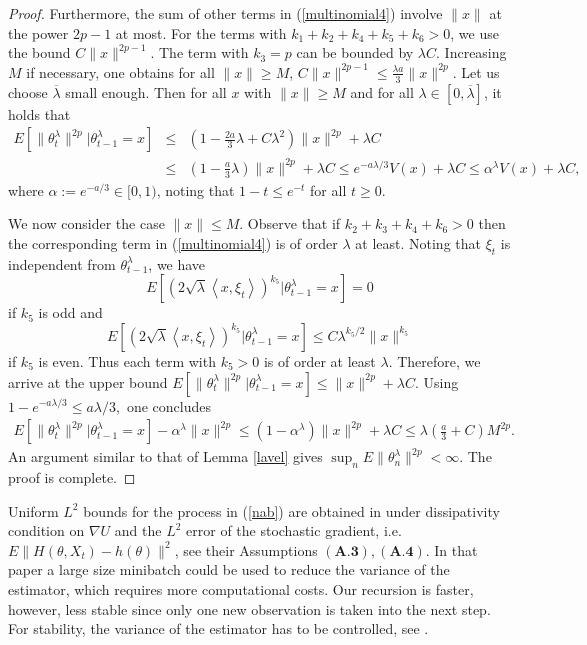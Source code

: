 \documentclass[a4paper]{article}
\begin{document}
\begin{proof}
Furthermore, the sum of other terms in (\ref{multinomial4}) involve $\|x\|$ at the power $2p-1$ at most. For the terms with
$k_1 + k_2 + k_4 + k_5 + k_6 > 0$, we use the bound $C\|x\|^{2p-1}$. The term with $k_3=p$ can be bounded by $\lambda C$. Increasing $M$ if necessary, one obtains for all $\|x\| \ge M$, $C\|x\|^{2p-1} \le \frac{\lambda a}{3} \|x\|^{2p}$. Let us choose $\overline{\lambda}$ small enough. Then for all $x$ with $\|x\| \ge M$ and
for all $\lambda \in [0, \overline{\lambda}]$, it holds that
	\begin{eqnarray*}
		E\left[ \|\theta^{\lambda}_t\|^{2p} | \theta^{\lambda}_{t-1}=x \right] &\le&  (1 - \frac{2a}{3} \lambda + C \lambda^2)  \|x\|^{2p}  + \lambda C \\
		&\le& (1 - \frac{a}{3} \lambda) \| x\|^{2p} + \lambda C \le e^{-a \lambda/3} V(x) + \lambda C \le \alpha^{\lambda} V(x) + \lambda C,
	\end{eqnarray*}
	where $\alpha := e^{-a/3} \in [0,1)$, noting that $1 - t \le e^{-t}$
for all $t \ge 0$.
	
	We now consider the case $\|x\| \le M$. Observe that if $k_2 + k_3 + k_4 + k_6 > 0$ then the corresponding term in (\ref{multinomial4}) is of order $\lambda$ at least. Noting that $\xi_{t}$ is independent from $\theta^{\lambda}_{t-1}$, we have
	$$ E\left[ \left( 2 \sqrt{\lambda} \left\langle x, \xi_t \right\rangle \right) ^{k_5}\vert \theta^{\lambda}_{t-1}=x \right] = 0$$
	if $k_5$ is odd and
	$$E\left[ \left( 2 \sqrt{\lambda} \left\langle x, \xi_t \right\rangle \right) ^{k_5}\vert \theta^{\lambda}_{t-1}=x \right] \le C \lambda^{k_5/2}
\|x\|^{k_5}$$
	if $k_5$ is even. Thus each term with $k_5 > 0$ is of order at least $\lambda$. Therefore, we arrive at the upper bound
	$E\left[\|\theta^{\lambda}_{t}\|^{2p}\vert \theta^{\lambda}_{t-1}=x\right]
\le \|x\|^{2p} + \lambda C$. Using $1 - e^{-a\lambda/3} \le a \lambda/3,$ one concludes
	\begin{eqnarray*}
		E\left[ \|\theta^{\lambda}_t\|^{2p}\vert \theta^{\lambda}_{t-1}=x  \right] - \alpha^{\lambda}
\| x\|^{2p} \le (1-\alpha^{\lambda}) \|x\|^{2p} + \lambda C \le \lambda \left(\frac{a}{3} + C\right)M^{2p}.
	\end{eqnarray*}
An argument similar to that of Lemma \ref{lavel} gives $\sup_n E\|\theta^{\lambda}_n\|^{2p} < \infty$. The proof is complete.
\end{proof}

Uniform $L^2$ bounds for the process in (\ref{nab}) are obtained in \cite{raginsky} under dissipativity condition on $\nabla U$ and the $L^2$ error of the stochastic gradient, i.e. $E\|H(\theta, X_t) - h(\theta)\|^2$, see their Assumptions $(\textbf{A.3}), (\textbf{A.4})$. In that paper a large size minibatch could be used to reduce the variance of the estimator, which requires more computational costs. Our recursion is faster, however, less stable since only one new observation is taken into the next step. For stability, the variance of the estimator has to be controlled, see \cite{teh}.
\end{document}
